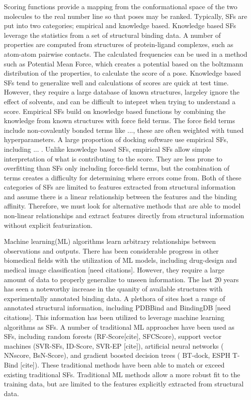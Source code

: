 \documentclass[journal=jcisd8,manuscript=article]{achemso}
\begin{document}
Scoring functions provide a mapping from the conformational space of the two molecules to the real number line so that poses may be ranked. Typically, SFs are put into two categories; empirical and knowledge based. Knowledge based SFs leverage the statistics from a set of structural binding data. A number of properties are computed from structures of protein-ligand complexes, such as atom-atom pairwise contacts. The calculated frequencies can be used in a method such as Potential Mean Force, which creates a potential based on the boltzmann distribution of the properties, to calculate the score of a pose. Knowledge based SFs tend to generalize well and calculations of scores are quick at test time. However, they require a large database of known structures, largeley ignore the effect of solvents, and can be difficult to intepret when trying to understand a score. Empirical SFs build on knowledge based functions by combining the knowledge from known structures with force field terms. The force field terms include non-covalently bonded terms like ..., these are often weighted with tuned hyperparameters. A large proportion of docking software use empirical SFs, including ... \cite{}. Unlike knowledge based SFs, empirical SFs allow simple interpretation of what is contributing to the score. They are less prone to overfitting than SFs only including force-field terms, but the combination of terms creates a difficulty for determining where errors come from. Both of these categories of SFs are limited to features extracted from structural information and assume there is a linear relationship between the features and the binding affinity. Therefore, we must look for alternative methods that are able to model non-linear relationships and extract features directly from structural information without explicit featurization.

Machine learning(ML) algorithms learn arbitrary relationships between observations and outputs. There has been considerable progress in other biomedical fields with the utilization of ML models, including drug-design and medical image classification [need citations]. However, they require a large amount of data to properly generalize to unseen information. The last 20 years has seen a noteworthy increase in the quanity of available structures with experimentally annotated binding data\cite{}. A plethora of sites host a range of annotated structural information, including PDBBind and BindingDB [need citations]. This information has been utilized to leverage machine learning algorithms as SFs. A number of traditional ML approaches have been used as SFs, including random forests (RF-Score[cite], SFCScore), support vector machines (SVR-SFs, ID-Score, SVR-EP [cite]), artificial neural networks ( NNscore, BsN-Score), and gradient boosted decision trees ( BT-dock, ESPH T-Bind [cite]). These traditional methods have been able to match or exceed existing traditional SFs. Traditional ML methods allow a more robust fit to the training data, but are limited to the features explicitly extracted from structural data.
\end{document}
